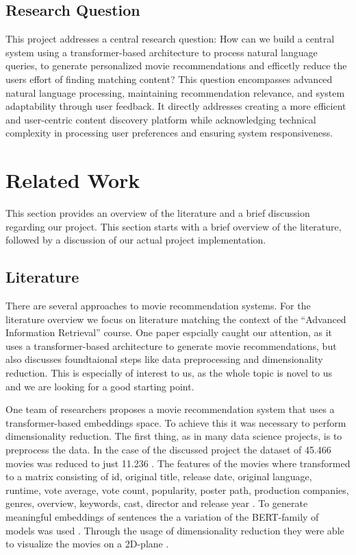 \documentclass[12pt,a4paper]{article}
\begin{document}
\subsection{Research Question}

This project addresses a central research question:
How can we build a central system using a transformer-based architecture to process natural language queries,
to generate personalized movie recommendations and efficetly reduce the users effort of finding matching content?
\newline \noindent This question encompasses advanced natural language processing, maintaining recommendation relevance, and system
adaptability through user feedback. It directly addresses creating a more efficient and user-centric content discovery
platform while acknowledging technical complexity in processing user preferences and ensuring system responsiveness.

\section{Related Work}

This section provides an overview of the literature and a brief discussion regarding our project.
This section starts with a brief overview of the literature, followed by a discussion of our actual project implementation.

\subsection{Literature}

There are several approaches to movie recommendation systems.
For the literature overview we focus on literature matching the context of the ``Advanced Information Retrieval'' course.
One paper espcially caught our attention, as it uses a transformer-based architecture to generate movie recommendations,
but also discusses foundtaional steps like data preprocessing and dimensionality reduction.
This is especially of interest to us, as the whole topic is novel to us and we are looking for a good starting point.

\noindent One team of researchers \cite{Iglesias-pardo-lopez-quintero-2024} proposes a movie recommendation system that uses a
transformer-based embeddings space. To achieve this it was necessary to perform dimensionality reduction.
The first thing, as in many data science projects, is to preprocess the data.
In the case of the discussed project the dataset of 45.466 movies was reduced to just 11.236 \cite{Iglesias-pardo-lopez-quintero-2024}.
The features of the movies where transformed to a matrix consisting of id, original title, release date,
original language, runtime, vote average, vote count, popularity, poster path, production companies, genres, overview,
keywords, cast, director and release year \cite{Iglesias-pardo-lopez-quintero-2024}.
To generate meaningful embeddings of sentences the a variation of the BERT-family of models was used \cite{Iglesias-pardo-lopez-quintero-2024}.
Through the usage of dimensionality reduction they were able to visualize the movies on a 2D-plane \cite{Iglesias-pardo-lopez-quintero-2024}.
\end{document}
